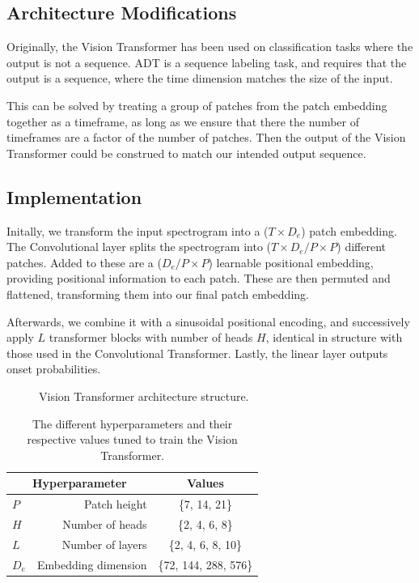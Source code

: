 \subsection{Architecture Modifications}

Originally, the Vision Transformer has been used on classification tasks where the output is not a sequence. \gls{ADT} is a sequence labeling task, and requires that the output is a sequence, where the time dimension matches the size of the input.

This can be solved by treating a group of patches from the patch embedding together as a timeframe, as long as we ensure that there the number of timeframes are a factor of the number of patches. Then the output of the Vision Transformer could be construed to match our intended output sequence.

\subsection{Implementation}

Initally, we transform the input spectrogram into a ($T \times D_e$) patch embedding. The Convolutional layer splits the spectrogram into ($T \times D_e / P \times P$) different patches. Added to these are a ($D_e / P \times P$) learnable positional embedding, providing positional information to each patch. These are then permuted and flattened, transforming them into our final patch embedding.

Afterwards, we combine it with a sinusoidal positional encoding, and successively apply $L$ transformer blocks with number of heads $H$, identical in structure with those used in the Convolutional Transformer. Lastly, the linear layer outputs onset probabilities.

\begin{figure}[H]
    \hspace*{-0.5cm}
    \centering
    
    \caption{Vision Transformer architecture structure.}
    \label{ViTFigure}
\end{figure}

\begin{table}[H]
    \centering
    \begin{tabular}{lr|c}
        \multicolumn{2}{c|}{Hyperparameter} & Values       \\
        \hline
        $P$ & Patch height      & \{7, 14, 21\} \\
        $H$ & Number of heads     & \{2, 4, 6, 8\} \\
        $L$ & Number of layers      & \{2, 4, 6, 8, 10\} \\
        $D_e$ & Embedding dimension      & \{72, 144, 288, 576\} \\
    \end{tabular}
    \caption{The different hyperparameters and their respective values tuned to train the Vision Transformer.}
    \label{ViTHyperparams}
\end{table}